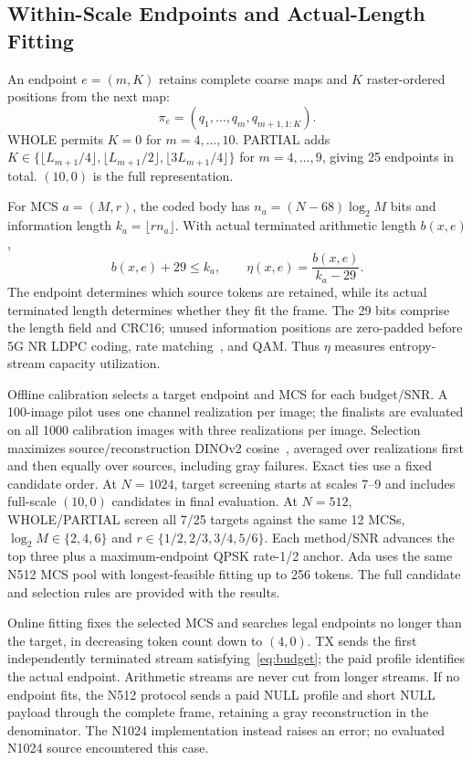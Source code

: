 \subsection{Within-Scale Endpoints and Actual-Length Fitting}
An endpoint $e=(m,K)$ retains complete coarse maps and $K$ raster-ordered positions from the next map:
\begin{equation}
 \pi_e=(q_1,\ldots,q_m,q_{m+1,1:K}).
 \label{eq:prefix}
\end{equation}
WHOLE permits $K=0$ for $m=4,\ldots,10$. PARTIAL adds
$K\in\{\lfloor L_{m+1}/4\rfloor,\allowbreak\lfloor L_{m+1}/2\rfloor,\allowbreak\lfloor3L_{m+1}/4\rfloor\}$ for $m=4,\ldots,9$, giving 25 endpoints in total. $(10,0)$ is the full representation.

For MCS $a=(M,r)$, the coded body has $n_a=(N-68)\log_2M$ bits and information length $k_a=\lfloor rn_a\rfloor$. With actual terminated arithmetic length $b(x,e)$,
\begin{equation}
 b(x,e)+29\leq k_a,\qquad \eta(x,e)=\frac{b(x,e)}{k_a-29}.
 \label{eq:budget}
\end{equation}
The endpoint determines which source tokens are retained, while its actual terminated length determines whether they fit the frame. The 29 bits comprise the length field and CRC16; unused information positions are zero-padded before 5G NR LDPC coding, rate matching~\cite{nr}, and QAM. Thus $\eta$ measures entropy-stream capacity utilization.

Offline calibration selects a target endpoint and MCS for each budget/SNR. A 100-image pilot uses one channel realization per image; the finalists are evaluated on all 1000 calibration images with three realizations per image. Selection maximizes source/reconstruction DINOv2 cosine~\cite{dinov2}, averaged over realizations first and then equally over sources, including gray failures. Exact ties use a fixed candidate order. At $N=1024$, target screening starts at scales 7--9 and includes full-scale $(10,0)$ candidates in final evaluation. At $N=512$, WHOLE/PARTIAL screen all 7/25 targets against the same 12 MCSs, $\log_2M\in\{2,4,6\}$ and $r\in\{1/2,2/3,3/4,5/6\}$. Each method/SNR advances the top three plus a maximum-endpoint QPSK rate-1/2 anchor. Ada uses the same N512 MCS pool with longest-feasible fitting up to 256 tokens. The full candidate and selection rules are provided with the results.

Online fitting fixes the selected MCS and searches legal endpoints no longer than the target, in decreasing token count down to $(4,0)$. TX sends the first independently terminated stream satisfying~\eqref{eq:budget}; the paid profile identifies the actual endpoint. Arithmetic streams are never cut from longer streams. If no endpoint fits, the N512 protocol sends a paid NULL profile and short NULL payload through the complete frame, retaining a gray reconstruction in the denominator. The N1024 implementation instead raises an error; no evaluated N1024 source encountered this case.

